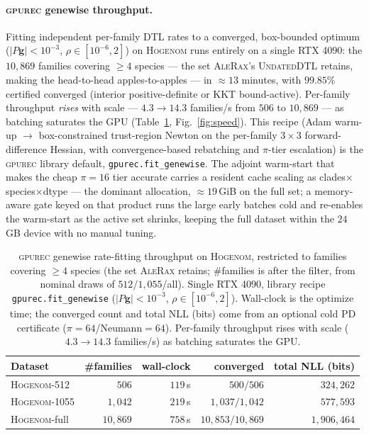 \documentclass[11pt]{article}
\newcommand{\toolname}{\textsc{gpurec}\xspace}
\newcommand{\grad}{\mathbf{g}}
\begin{document}
\paragraph{\toolname genewise throughput.} Fitting independent per-family DTL
rates to a converged, box-bounded optimum ($|P\grad|<10^{-3}$, $\rho\in[10^{-6},2]$)
on \textsc{Hogenom} runs entirely on a single RTX 4090: the $10{,}869$ families
covering $\geq\!4$ species --- the set \textsc{AleRax}'s \textsc{UndatedDTL} retains,
making the head-to-head apples-to-apples --- in $\approx\!13$ minutes, with
$99.85\%$ certified converged (interior positive-definite or KKT bound-active).
Per-family throughput \emph{rises} with scale --- $4.3\!\to\!14.3$ families/s from
$506$ to $10{,}869$ --- as batching saturates the GPU (Table~\ref{tab:speed},
Fig.~\ref{fig:speed}). This recipe (Adam warm-up $\to$ box-constrained trust-region
Newton on the per-family $3{\times}3$ forward-difference Hessian, with
convergence-based rebatching and $\pi$-tier escalation) is the \toolname library
default, \texttt{gpurec.fit\_genewise}. The adjoint warm-start that makes the cheap
$\pi{=}16$ tier accurate carries a resident cache scaling as
clades${\times}$species${\times}$dtype --- the dominant allocation, $\approx\!19$\,GiB
on the full set; a memory-aware gate keyed on that product runs the large early
batches cold and re-enables the warm-start as the active set shrinks, keeping the
full dataset within the $24$\,GB device with no manual tuning.

\begin{table}[t]\centering
\caption{\toolname genewise rate-fitting throughput on \textsc{Hogenom}, restricted to families
covering $\geq\!4$ species (the set \textsc{AleRax} retains; \#families is after the filter, from
nominal draws of $512$/$1{,}055$/all). Single RTX 4090, library recipe \texttt{gpurec.fit\_genewise}
($|P\grad|<10^{-3}$, $\rho\in[10^{-6},2]$). Wall-clock is the optimize time; the converged count
and total NLL (bits) come from an optional cold PD certificate ($\pi{=}64$/Neumann${=}64$).
Per-family throughput rises with scale ($4.3\!\to\!14.3$ families/s) as batching saturates the GPU.}
\label{tab:speed}
\begin{tabular}{lrrr r}
\toprule
Dataset & \#families & wall-clock & converged & total NLL (bits) \\
\midrule
\textsc{Hogenom}-512   & $506$      & $119$\,s   & $500/506$           & $324{,}262$ \\
\textsc{Hogenom}-1055  & $1{,}042$  & $219$\,s   & $1{,}037/1{,}042$   & $577{,}593$ \\
\textsc{Hogenom}-full  & $10{,}869$ & $758$\,s   & $10{,}853/10{,}869$ & $1{,}906{,}464$ \\
\bottomrule
\end{tabular}
\end{table}
\end{document}
